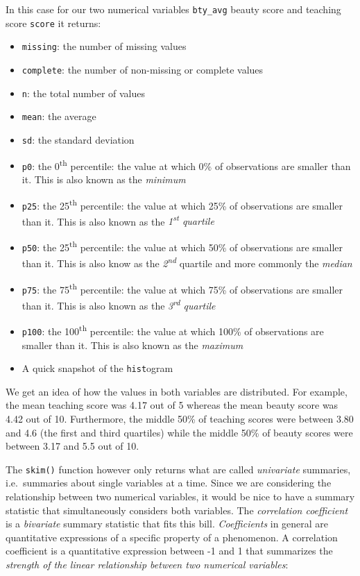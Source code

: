 \documentclass[12pt,]{krantz}
\providecommand{\tightlist}{%
  \setlength{\itemsep}{0pt}\setlength{\parskip}{0pt}}
\theoremstyle{definition}
\theoremstyle{definition}
\theoremstyle{definition}
\theoremstyle{remark}
\begin{document}
In this case for our two numerical variables \texttt{bty\_avg} beauty
score and teaching score \texttt{score} it returns:

\begin{itemize}
\tightlist
\item
  \texttt{missing}: the number of missing values
\item
  \texttt{complete}: the number of non-missing or complete values
\item
  \texttt{n}: the total number of values
\item
  \texttt{mean}: the average
\item
  \texttt{sd}: the standard deviation
\item
  \texttt{p0}: the 0\textsuperscript{th} percentile: the value at which
  0\% of observations are smaller than it. This is also known as the
  \emph{minimum}
\item
  \texttt{p25}: the 25\textsuperscript{th} percentile: the value at
  which 25\% of observations are smaller than it. This is also known as
  the \emph{1\textsuperscript{st} quartile}
\item
  \texttt{p50}: the 25\textsuperscript{th} percentile: the value at
  which 50\% of observations are smaller than it. This is also know as
  the \emph{2\textsuperscript{nd}} quartile and more commonly the
  \emph{median}
\item
  \texttt{p75}: the 75\textsuperscript{th} percentile: the value at
  which 75\% of observations are smaller than it. This is also known as
  the \emph{3\textsuperscript{rd} quartile}
\item
  \texttt{p100}: the 100\textsuperscript{th} percentile: the value at
  which 100\% of observations are smaller than it. This is also known as
  the \emph{maximum}
\item
  A quick snapshot of the \texttt{hist}ogram
\end{itemize}

We get an idea of how the values in both variables are distributed. For
example, the mean teaching score was 4.17 out of 5 whereas the mean
beauty score was 4.42 out of 10. Furthermore, the middle 50\% of
teaching scores were between 3.80 and 4.6 (the first and third
quartiles) while the middle 50\% of beauty scores were between 3.17 and
5.5 out of 10.

The \texttt{skim()} function however only returns what are called
\emph{univariate} summaries, i.e.~summaries about single variables at a
time. Since we are considering the relationship between two numerical
variables, it would be nice to have a summary statistic that
simultaneously considers both variables. The \emph{correlation
coefficient} is a \emph{bivariate} summary statistic that fits this
bill. \emph{Coefficients} in general are quantitative expressions of a
specific property of a phenomenon. A correlation coefficient is a
quantitative expression between -1 and 1 that summarizes the
\emph{strength of the linear relationship between two numerical
variables}:
\end{document}
